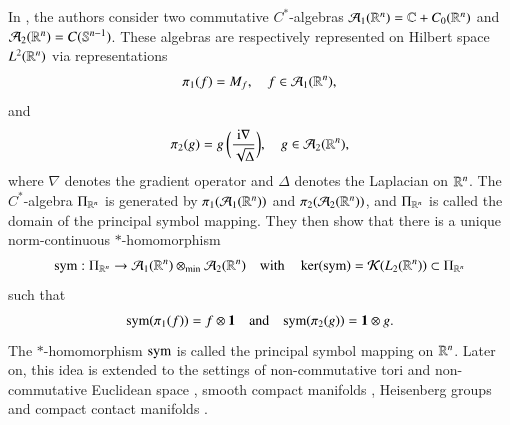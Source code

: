 \documentclass[leqno]{amsart}
\begin{document}
	In \cite{DAO1}, the authors consider two commutative $C^{*}$-algebras ${\mathcal A}_{1}(\mathbb{R}^{n})=\mathbb{C}+C_{0}(\mathbb{R}^{n})$ and ${\mathcal A}_{2}(\mathbb{R}^{n})=C(\mathbb{S}^{n-1})$. These algebras are respectively represented on Hilbert space $L^{2}(\mathbb{R}^{n})$ via representations
	\begin{align*}
		\pi_{1}(f)=M_{f},\quad f\in {\mathcal A}_{1}(\mathbb{R}^{n}),
	\end{align*}
	and 
	\begin{align*}
		\pi_{2}(g)=g\,\biggl(\frac{{\rm i}\nabla}{\sqrt{\Delta}}\biggr),\quad g\in {\mathcal A}_{2}(\mathbb{R}^{n}),
	\end{align*}
	where $\nabla$ denotes the gradient operator and $\Delta$ denotes the Laplacian on $\mathbb{R}^{n}$. The $C^{*}$-algebra $\Pi_{\mathbb{R}^{n}}$ is generated by $\pi_{1}({\mathcal A}_{1}(\mathbb{R}^{n}))$ and $\pi_{2}({\mathcal A}_{2}(\mathbb{R}^{n}))$, and $\Pi_{\mathbb{R}^{n}}$ is called the domain of the principal symbol mapping. 
	They then show that there is a unique norm-continuous $*$-homomorphism
	\begin{align*}
		{\rm sym}:\Pi_{\mathbb{R}^{n}}\rightarrow {\mathcal A}_{1}(\mathbb{R}^{n})\otimes_{\rm min}{\mathcal A}_{2}(\mathbb{R}^{n})
		\quad\mbox{with}\quad \ker({\rm sym})={\mathcal K}(L_{2}(\mathbb{R}^{n}))\subset\Pi_{\mathbb{R}^{n}}
	\end{align*}
	such that 
	\begin{align*}
		{\rm sym}(\pi_{1}(f))=f\otimes\mathbf 1 \quad\mbox{and}\quad 
		{\rm sym}(\pi_{2}(g))=\mathbf 1\otimes g.
	\end{align*}
	The $*$-homomorphism ${\rm sym}$ is called the principal symbol mapping on $\mathbb{R}^{n}$.
	Later on, this idea is extended to the settings of non-commutative tori and non-commutative Euclidean space \cite{DAO2}, smooth compact manifolds \cite{DAO3}, Heisenberg groups and compact contact manifolds \cite{DAO4}.
	
\end{document}
